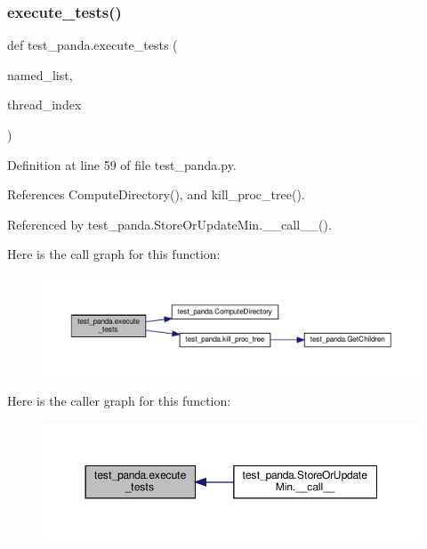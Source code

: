 \subsubsection{\texorpdfstring{execute\+\_\+tests()}{execute\_tests()}}
{\footnotesize\ttfamily def test\+\_\+panda.\+execute\+\_\+tests (\begin{DoxyParamCaption}\item[{}]{named\+\_\+list,  }\item[{}]{thread\+\_\+index }\end{DoxyParamCaption})}



Definition at line 59 of file test\+\_\+panda.\+py.



References Compute\+Directory(), and kill\+\_\+proc\+\_\+tree().



Referenced by test\+\_\+panda.\+Store\+Or\+Update\+Min.\+\_\+\+\_\+call\+\_\+\+\_\+().

Here is the call graph for this function\+:
\nopagebreak
\begin{figure}[H]
\begin{center}
\leavevmode
\includegraphics[width=350pt]{d0/dee/namespacetest__panda_a141cf457e8422fb7cf53f38d87b8a3b2_cgraph}
\end{center}
\end{figure}
Here is the caller graph for this function\+:
\nopagebreak
\begin{figure}[H]
\begin{center}
\leavevmode
\includegraphics[width=350pt]{d0/dee/namespacetest__panda_a141cf457e8422fb7cf53f38d87b8a3b2_icgraph}
\end{center}
\end{figure}
\mbox{\label{namespacetest__panda_a146f3fdf19c2b31d27990e1c44872718}} 
